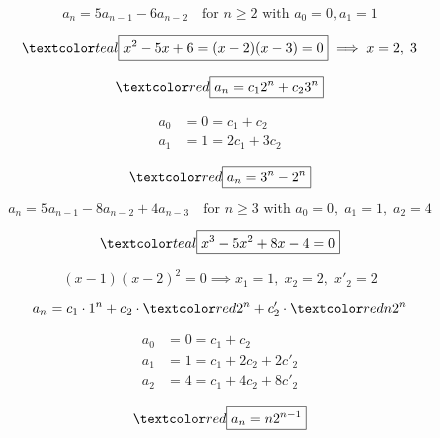 \begin{frame}{}
  \[
    a_n = 5a_{n-1} - 6a_{n-2} \quad \text{for } n \ge 2 \text{ with } a_0 = 0, a_1 = 1
  \]

  \pause
  \[
    \teal{\boxed{x^2 - 5x + 6 = (x-2) (x-3) = 0}} \implies x = 2,\; 3
  \]

  \pause
  \[
    \red{\boxed{a_n = c_1 2^n + c_2 3^n}}
  \]
  
  \pause
  \begin{align*}
    a_0 &= 0 = c_1 + c_2 \\
    a_1 &= 1 = 2c_1 + 3c_2
  \end{align*}

  \pause
  \[
    \red{\boxed{a_n = 3^n - 2^n}}
  \]
\end{frame}

\begin{frame}{}
  \[
    a_n = 5 a_{n-1} - 8 a_{n-2} + 4 a_{n-3} 
    \quad \text{for } n \ge 3 \text{ with } a_0 = 0,\; a_1 = 1,\; a_2 = 4
  \]

  \pause
  \[
    \teal{\boxed{x^3 - 5x^2 + 8x - 4 = 0}}
  \]

  \pause
  \[
    (x-1) (x-2)^2 = 0 \implies x_1 = 1,\; x_{2} = 2,\; x'_{2} = 2
  \]

  \pause
  \[
    a_n = c_1 \cdot 1^{n} + c_{2} \cdot \red{2^{n}} + c'_{2} \cdot \red{n 2^{n}}
  \]

  \pause
  \vspace{-0.30cm}
  \begin{align*}
    a_0 &= 0 = c_1 + c_2 \\
    a_1 &= 1 = c_1 + 2c_2 + 2c'_{2} \\
    a_2 &= 4 = c_1 + 4c_2 + 8c'_{2}
  \end{align*}

  \pause
  \[
    \red{\boxed{a_n = n 2^{n-1}}}
  \]
\end{frame}

